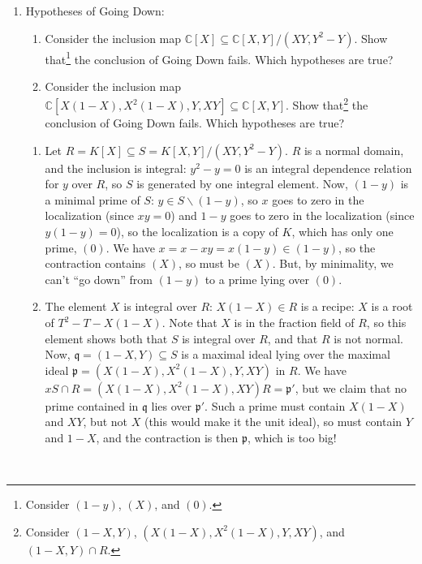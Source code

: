 \documentclass[12pt]{amsart}
\newcommand{\C}{\mathbb{C}}
\newcommand{\p}{\mathfrak{p}}
\newcommand{\q}{\mathfrak{q}}
\renewcommand{\1}{\mathbbm{1}}
\newcommand{\solution}[1]{\ifthenelse {\equal{\displaysol}{1}} {\begin{framed}{\color{meretale}\noindent #1}\end{framed}} { \ }}
\newcommand\itemB{\stepcounter{enumi}\item[(\theenumi)]}
\newcommand\itemb{\stepcounter{enumii}\item[(\theenumii)]}
\begin{document}
\begin{enumerate}
\itemB Hypotheses of Going Down:
\begin{enumerate}
\itemb Consider the inclusion map $\C[X] \subseteq \C[X,Y]/(XY,Y^2-Y)$. Show that\footnote{Consider $(1-y)$, $(X)$, and $(0)$.} the conclusion of Going Down fails. Which hypotheses are true?
\itemb Consider the inclusion map $\C[X(1-X),X^2(1-X),Y,XY] \subseteq \C[X,Y]$. Show that\footnote{Consider $(1-X,Y)$, $(X(1-X),X^2(1-X),Y,XY)$, and $(1-X,Y)\cap R$.} the conclusion of Going Down fails. Which hypotheses are true?
\end{enumerate}
\solution{
\begin{enumerate}
\item Let $R=K[X]\subseteq S=K[X,Y]/(XY,Y^2-Y)$. $R$ is a normal domain, and the inclusion is integral: $y^2-y=0$ is an integral dependence relation for $y$ over $R$, so $S$ is generated by one integral element. Now, $(1-y)$ is a minimal prime of $S$: $y\in S\smallsetminus (1-y)$, so $x$ goes to zero in the localization (since $xy=0$) and $1-y$ goes to zero in the localization (since $y(1-y)=0$), so the localization is a copy of $K$, which has only one prime, $(0)$. We have $x=x-xy=x(1-y)\in (1-y)$, so the contraction contains $(X)$, so must be $(X)$. But, by minimality, we can't ``go down'' from $(1-y)$ to a prime lying over $(0)$.
\item The element $X$ is integral over $R$: $X(1-X)\in R$ is a recipe: $X$ is a root of $T^2-T-X(1-X)$. Note that $X$ is in the fraction field of $R$, so this element shows both that $S$ is integral over $R$, and that $R$ is not normal. Now, $\q=(1-X,Y)\subseteq S$ is a maximal ideal lying over the maximal ideal $\p={(X(1-X),X^2(1-X),Y,XY)}$ in $R$. We have $xS \cap R = {(X(1-X),X^2(1-X),XY)R}=\p'$, but we claim that no prime contained in $\q$ lies over $\p'$. Such a prime must contain $X(1-X)$ and $XY$, but not $X$ (this would make it the unit ideal), so must contain $Y$ and $1-X$, and the contraction is then $\p$, which is too big!
\end{enumerate}

}


\end{enumerate}
\end{document}
